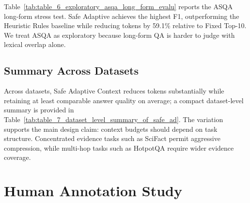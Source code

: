 \documentclass[11pt]{article}
\begin{document}
\begin{table}[t]
\centering
\small
\setlength{\tabcolsep}{4pt}
\caption{Exploratory ASQA long-form evaluation with Llama-70B. Token reduction is measured relative to Fixed Top-10.}
\label{tab:table_6_exploratory_asqa_long_form_evalu}
\end{table}

Table~\ref{tab:table_6_exploratory_asqa_long_form_evalu} reports the ASQA long-form stress test. Safe Adaptive achieves the highest F1, outperforming the Heuristic Rules baseline while reducing tokens by 59.1\% relative to Fixed Top-10. We treat ASQA as exploratory because long-form QA is harder to judge with lexical overlap alone.


\subsection{Summary Across Datasets}

Across datasets, Safe Adaptive Context reduces tokens substantially while retaining at least comparable answer quality on average; a compact dataset-level summary is provided in Table~\ref{tab:table_7_dataset_level_summary_of_safe_ad}. The variation supports the main design claim: context budgets should depend on task structure. Concentrated evidence tasks such as SciFact permit aggressive compression, while multi-hop tasks such as HotpotQA require wider evidence coverage.


\section{Human Annotation Study}
\label{sec:human-annotation}
\end{document}
